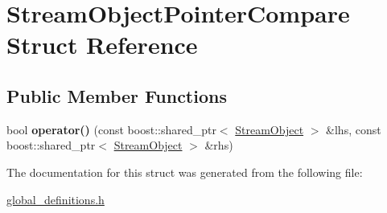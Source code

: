 \hypertarget{struct_stream_object_pointer_compare}{}\section{Stream\+Object\+Pointer\+Compare Struct Reference}
\label{struct_stream_object_pointer_compare}
\subsection*{Public Member Functions}
\begin{DoxyCompactItemize}
\item 
bool {\bfseries operator()} (const boost\+::shared\+\_\+ptr$<$ \hyperlink{class_stream_object}{Stream\+Object} $>$ \&lhs, const boost\+::shared\+\_\+ptr$<$ \hyperlink{class_stream_object}{Stream\+Object} $>$ \&rhs)\hypertarget{struct_stream_object_pointer_compare_ab56cc34480304528a919b8f81d5b293c}{}\label{struct_stream_object_pointer_compare_ab56cc34480304528a919b8f81d5b293c}

\end{DoxyCompactItemize}


The documentation for this struct was generated from the following file\+:\begin{DoxyCompactItemize}
\item 
\hyperlink{global__definitions_8h}{global\+\_\+definitions.\+h}\end{DoxyCompactItemize}

